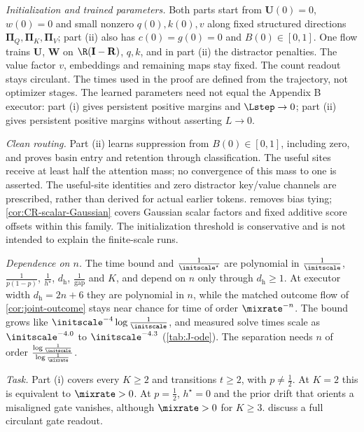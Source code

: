 \begin{remark}
\label{rem:joint-scope}
\emph{Initialization and trained parameters.} Both parts start from $\mathbf U(0)=0$, $w(0)=0$ and small nonzero
$q(0),k(0),v$ along fixed structured directions $\bm\Pi_Q,\bm\Pi_K,\bm\Pi_V$; part (ii) also has $c(0)=g(0)=0$ and
$B(0)\in[0,1]$. One flow trains $\mathbf U$, $\mathbf W$ on $\R(\mathbf I-\mathbf R)$, $q,k$, and in part (ii) the distractor
penalties. The value factor $v$, embeddings and remaining maps stay fixed. The count readout stays circulant.
The times used in the proof are defined from the trajectory, not optimizer stages. The learned parameters need not equal the Appendix B executor:
part (i) gives persistent positive margins and $\Lstep\to0$; part (ii) gives persistent positive margins without asserting $L\to0$.

\emph{Clean routing.} Part (ii) learns suppression from $B(0)\in[0,1]$, including zero, and proves basin entry and retention
through classification. The useful sites receive at least half the attention mass; no convergence of this mass to one is asserted.
The useful-site identities and zero distractor key/value channels are prescribed, rather than derived for actual earlier tokens.
 removes bias tying; \cref{cor:CR-scalar-Gaussian}
covers Gaussian scalar factors and fixed additive score offsets within this family. The initialization threshold is conservative and is not intended to explain the finite-scale runs.

\emph{Dependence on $n$.} The time bound and $\frac{1}{\initscale^\star}$ are polynomial in $\frac{1}{\initscale}$,
$\frac{1}{p(1-p)}$, $\frac{1}{h^\star}$, $d_{\mathrm h}$, $\frac{1}{\mathrm{gap}}$ and $K$, and depend on $n$ only through
$d_{\mathrm h}\ge1$. At executor width $d_{\mathrm h}=2n+6$ they are polynomial in $n$, while the matched outcome flow
of \cref{cor:joint-outcome} stays near chance for time of order $\mixrate^{-n}$. The bound grows like
$\initscale^{-4}\log\frac{1}{\initscale}$, and measured solve times scale as $\initscale^{-4.0}$ to $\initscale^{-4.3}$
(\cref{tab:J-ode}). The separation needs $n$ of order $\frac{\log\frac{1}{\initscale}}{\log\frac{1}{\mixrate}}$.

\emph{Task.} Part (i) covers every $K\ge2$ and transitions $t\ge2$, with $p\ne\frac12$. At $K=2$ this is equivalent to
$\mixrate>0$. At $p=\frac12$, $h^\star=0$ and the prior drift that orients a misaligned gate vanishes, although
$\mixrate>0$ for $K\ge3$.  discuss a full circulant gate readout.


\end{remark}
